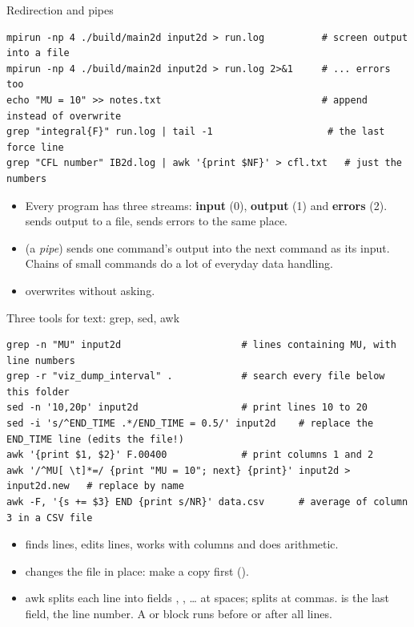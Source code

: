\documentclass[aspectratio=169,11pt]{beamer}
\begin{document}
\begin{frame}[fragile]{Redirection and pipes}
\begin{lstlisting}[style=shell]
mpirun -np 4 ./build/main2d input2d > run.log          # screen output into a file
mpirun -np 4 ./build/main2d input2d > run.log 2>&1     # ... errors too
echo "MU = 10" >> notes.txt                            # append instead of overwrite
grep "integral{F}" run.log | tail -1                    # the last force line
grep "CFL number" IB2d.log | awk '{print $NF}' > cfl.txt   # just the numbers
\end{lstlisting}
\begin{itemize}\small
  \item Every program has three streams: \textbf{input} (0), \textbf{output} (1) and \textbf{errors} (2). \code{>} sends output to a file,  sends errors to the same place.
  \item \code{|} (a \emph{pipe}) sends one command's output into the next command as its input. Chains of small commands do a lot of everyday data handling.
  \item {} overwrites  without asking.
\end{itemize}
\end{frame}

\begin{frame}[fragile]{Three tools for text: grep, sed, awk}
\begin{lstlisting}[style=shell]
grep -n "MU" input2d                     # lines containing MU, with line numbers
grep -r "viz_dump_interval" .            # search every file below this folder
sed -n '10,20p' input2d                  # print lines 10 to 20
sed -i 's/^END_TIME .*/END_TIME = 0.5/' input2d    # replace the END_TIME line (edits the file!)
awk '{print $1, $2}' F.00400             # print columns 1 and 2
awk '/^MU[ \t]*=/ {print "MU = 10"; next} {print}' input2d > input2d.new   # replace by name
awk -F, '{s += $3} END {print s/NR}' data.csv      # average of column 3 in a CSV file
\end{lstlisting}
\begin{itemize}\small
  \item {} finds lines,  edits lines,  works with columns and does arithmetic.
  \item {} changes the file in place: make a copy first ().
  \item awk splits each line into fields , , \ldots{} at spaces;  splits at commas.  is the last field,  the line number. A  or  block runs before or after all lines.
\end{itemize}
\end{frame}
\end{document}
